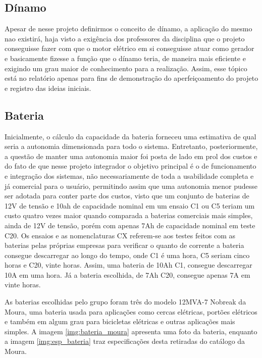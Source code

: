 	\subsection{Dínamo}
	Apesar de nesse projeto definirmos o conceito de dínamo, a aplicação do mesmo nao existirá, haja visto a exigência dos professores da disciplina que o projeto conseguisse fazer com que o motor elétrico em si conseguisse atuar como gerador e basicamente fizesse a função que o dínamo teria, de maneira mais eficiente e exigindo um grau maior de conhecimento para a realização. Assim, esse tópico está no relatório apenas para fins de demonstração do aperfeiçoamento do projeto e registro das ideias iniciais. 

  
\subsection{Bateria}
	Inicialmente, o cálculo da capacidade da bateria forneceu uma estimativa de qual seria a autonomia dimensionada para todo o sistema. Entretanto, posteriormente, a questão de manter uma autonomia maior foi posta de lado em prol dos custos e do fato de que nesse projeto integrador o objetivo principal é o de funcionamento e integração dos sistemas, não necessariamente de toda a usabilidade completa e já comercial para o usuário, permitindo assim que uma autonomia menor pudesse ser adotada para conter parte dos custos, visto que um conjunto de baterias de 12V de tensão e 10ah de capacidade nominal em um ensaio C1 ou C5 teriam um custo quatro vezes maior quando comparada a baterias comerciais mais simples, ainda de 12V de tensão, porém com apenas 7Ah de capacidade nominal em teste C20. Os ensaios e as nomenclaturas CX referem-se aos testes feitos com as baterias pelas próprias empresas para verificar o quanto de corrente a bateria consegue descarregar ao longo do tempo, onde C1 é uma hora, C5 seriam cinco horas e C20, vinte horas. Assim, uma bateria de 10Ah C1, consegue descarregar 10A em uma hora. Já a bateria escolhida, de 7Ah C20, consegue apenas 7A em vinte horas.
	
	As baterias escolhidas pelo grupo foram três do modelo 12MVA-7 Nobreak da Moura, uma bateria usada para aplicações como cercas elétricas, portões elétricos e também em algum grau para bicicletas elétricas e outras aplicações mais simples. A imagem \ref{img:bateria_moura} apresenta uma foto da bateria, enquanto a imagem \ref{img:esp_bateria} traz especificações desta retiradas do catálogo da Moura. 
	
